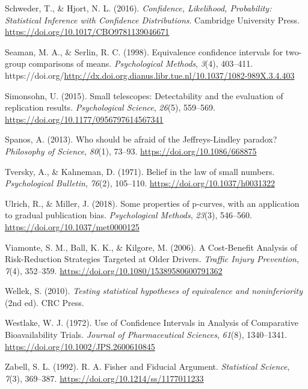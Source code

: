 \documentclass[
  letterpaper,
  DIV=11,
  numbers=noendperiod]{scrreprt}
\newlength{\cslhangindent}
\newlength{\cslentryspacingunit} %
\newenvironment{CSLReferences}[2] %
 {%
  \setlength{\parindent}{0pt}
  \ifodd #1
  \let\oldpar\par
  \def\par{\hangindent=\cslhangindent\oldpar}
  \fi
  \setlength{\parskip}{#2\cslentryspacingunit}
 }%
 {}
\begin{document}
\begin{CSLReferences}{1}{0}
\leavevmode{}%
Schweder, T., \& Hjort, N. L. (2016). \emph{Confidence, {Likelihood},
{Probability}: {Statistical Inference} with {Confidence Distributions}}.
{Cambridge University Press}.
\url{https://doi.org/10.1017/CBO9781139046671}

\leavevmode{}%
Seaman, M. A., \& Serlin, R. C. (1998). Equivalence confidence intervals
for two-group comparisons of means. \emph{Psychological Methods},
\emph{3}(4), 403--411.
https://doi.org/\url{http://dx.doi.org.dianus.libr.tue.nl/10.1037/1082-989X.3.4.403}

\leavevmode{}%
Simonsohn, U. (2015). Small telescopes: {Detectability} and the
evaluation of replication results. \emph{Psychological Science},
\emph{26}(5), 559--569. \url{https://doi.org/10.1177/0956797614567341}

\leavevmode{}%
Spanos, A. (2013). Who should be afraid of the {Jeffreys-Lindley}
paradox? \emph{Philosophy of Science}, \emph{80}(1), 73--93.
\url{https://doi.org/10.1086/668875}

\leavevmode{}%
Tversky, A., \& Kahneman, D. (1971). Belief in the law of small numbers.
\emph{Psychological Bulletin}, \emph{76}(2), 105--110.
\url{https://doi.org/10.1037/h0031322}

\leavevmode{}%
Ulrich, R., \& Miller, J. (2018). Some properties of p-curves, with an
application to gradual publication bias. \emph{Psychological Methods},
\emph{23}(3), 546--560. \url{https://doi.org/10.1037/met0000125}

\leavevmode{}%
Viamonte, S. M., Ball, K. K., \& Kilgore, M. (2006). A {Cost-Benefit
Analysis} of {Risk-Reduction Strategies Targeted} at {Older Drivers}.
\emph{Traffic Injury Prevention}, \emph{7}(4), 352--359.
\url{https://doi.org/10.1080/15389580600791362}

\leavevmode{}%
Wellek, S. (2010). \emph{Testing statistical hypotheses of equivalence
and noninferiority} (2nd ed). {CRC Press}.

\leavevmode{}%
Westlake, W. J. (1972). Use of {Confidence Intervals} in {Analysis} of
{Comparative Bioavailability Trials}. \emph{Journal of Pharmaceutical
Sciences}, \emph{61}(8), 1340--1341.
\url{https://doi.org/10.1002/JPS.2600610845}

\leavevmode{}%
Zabell, S. L. (1992). R. {A}. {Fisher} and {Fiducial Argument}.
\emph{Statistical Science}, \emph{7}(3), 369--387.
\url{https://doi.org/10.1214/ss/1177011233}

\end{CSLReferences}
\end{document}
